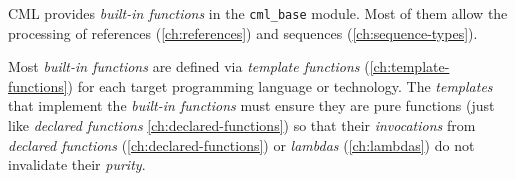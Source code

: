 CML provides \emph{built-in functions} in the \verb|cml_base| module.
Most of them allow the processing of
references (\ref{ch:references}) and sequences (\ref{ch:sequence-types}).

Most \emph{built-in functions} are defined via \emph{template functions} (\ref{ch:template-functions})
for each target programming language or technology.
The \emph{templates} that implement the \emph{built-in functions}
must ensure they are pure functions (just like \emph{declared functions} \ref{ch:declared-functions})
so that their \emph{invocations} from
\emph{declared functions} (\ref{ch:declared-functions})
or \emph{lambdas} (\ref{ch:lambdas}) do not invalidate their \emph{purity}.
